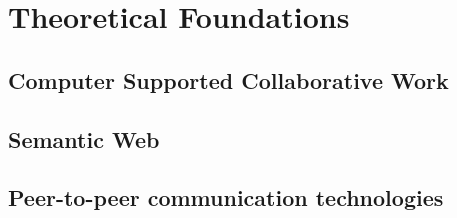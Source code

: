 
\chapter{Theoretical Foundations} %
\label{cha:theoretical_foundations}

\section{Computer Supported Collaborative Work}
\label{sec:cscw}


\section{Semantic Web}
\label{sec:semantic_web}


\section{Peer-to-peer communication technologies}
\label{sec:p2p_communication}


